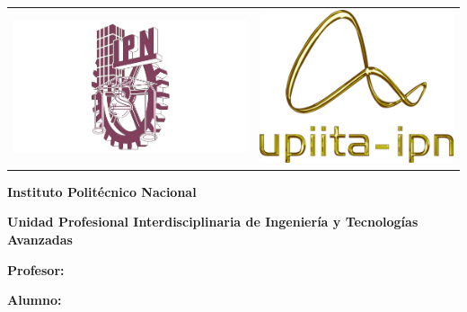 \begin{titlepage}
    \noindent
    \begin{tabular}{@{} p{} p{} @{}}
        \includegraphics[width=0.8\linewidth]{./img/logo-ipn.png} &
        \hfill \includegraphics[width=0.6\linewidth]{./img/logo-upiita.png} \\
    \end{tabular}


    \centering
    \vspace*{1cm}
    {\huge \textbf{Instituto Politécnico Nacional} \par}
    {\LARGE \textbf{Unidad Profesional Interdisciplinaria de Ingeniería y Tecnologías Avanzadas} \par}
    \vspace{1.5cm}
    {\LARGE \textbf{\materia} \par} %
    \vspace{1cm}
    {\Huge \titulo \par}            %
    \vspace{2cm}
    {\large \textbf{Profesor:} \profesor \par} %
    {\large \textbf{Alumno:} \alumno \par}     %
    \vfill
    {\large \textbf{\grupo} \par}       %
    
    {\large \fecha \par}            %
\end{titlepage}